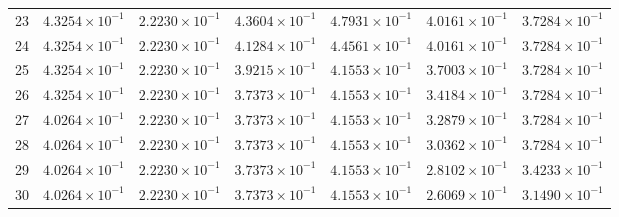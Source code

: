 \begin{table}[H]
\begin{tabular}{@{}rrrrrrr@{}}
23 & $4.3254\times10^{-1}$ & $2.2230\times10^{-1}$ & $4.3604\times10^{-1}$ & $4.7931\times10^{-1}$ & $4.0161\times10^{-1}$ & $3.7284\times10^{-1}$\\
24 & $4.3254\times10^{-1}$ & $2.2230\times10^{-1}$ & $4.1284\times10^{-1}$ & $4.4561\times10^{-1}$ & $4.0161\times10^{-1}$ & $3.7284\times10^{-1}$\\
25 & $4.3254\times10^{-1}$ & $2.2230\times10^{-1}$ & $3.9215\times10^{-1}$ & $4.1553\times10^{-1}$ & $3.7003\times10^{-1}$ & $3.7284\times10^{-1}$\\
26 & $4.3254\times10^{-1}$ & $2.2230\times10^{-1}$ & $3.7373\times10^{-1}$ & $4.1553\times10^{-1}$ & $3.4184\times10^{-1}$ & $3.7284\times10^{-1}$\\
27 & $4.0264\times10^{-1}$ & $2.2230\times10^{-1}$ & $3.7373\times10^{-1}$ & $4.1553\times10^{-1}$ & $3.2879\times10^{-1}$ & $3.7284\times10^{-1}$\\
28 & $4.0264\times10^{-1}$ & $2.2230\times10^{-1}$ & $3.7373\times10^{-1}$ & $4.1553\times10^{-1}$ & $3.0362\times10^{-1}$ & $3.7284\times10^{-1}$\\
29 & $4.0264\times10^{-1}$ & $2.2230\times10^{-1}$ & $3.7373\times10^{-1}$ & $4.1553\times10^{-1}$ & $2.8102\times10^{-1}$ & $3.4233\times10^{-1}$\\
30 & $4.0264\times10^{-1}$ & $2.2230\times10^{-1}$ & $3.7373\times10^{-1}$ & $4.1553\times10^{-1}$ & $2.6069\times10^{-1}$ & $3.1490\times10^{-1}$\\
\bottomrule
\end{tabular}
\end{table}

